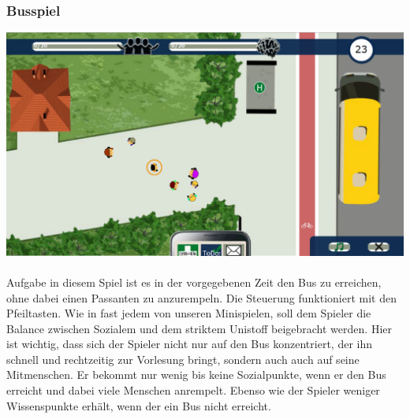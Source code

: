 \documentclass[a4paper, 11pt]{article} %
\begin{document}
\subsubsection{Busspiel}
\includegraphics[scale=0.46]{images/spiel/busspiel.png}\\\\
Aufgabe in diesem Spiel ist es in der vorgegebenen Zeit den Bus zu erreichen, ohne dabei einen Passanten zu anzurempeln. Die Steuerung funktioniert mit den Pfeiltasten. Wie in fast jedem von unseren Minispielen, soll dem Spieler die Balance zwischen Sozialem und dem striktem Unistoff beigebracht werden. Hier ist wichtig, dass sich der Spieler nicht nur auf den Bus konzentriert, der ihn schnell und rechtzeitig zur Vorlesung bringt, sondern auch auch auf seine Mitmenschen. Er bekommt nur wenig bis keine Sozialpunkte, wenn er den Bus erreicht und dabei viele Menschen anrempelt. Ebenso wie der Spieler weniger Wissenspunkte erhält, wenn der ein Bus nicht erreicht.
\end{document}
